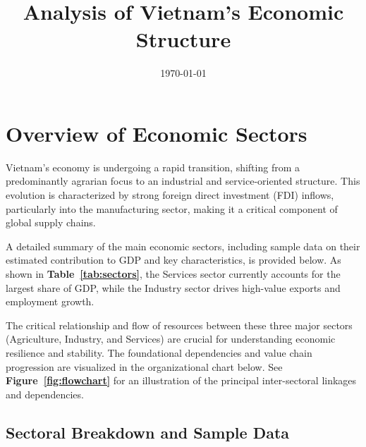 \documentclass{article}
\title{Analysis of Vietnam's Economic Structure}
\date{\today}
\begin{document}
\maketitle

\section{Overview of Economic Sectors}

Vietnam's economy is undergoing a rapid transition, shifting from a predominantly agrarian focus to an industrial and service-oriented structure. This evolution is characterized by strong foreign direct investment (FDI) inflows, particularly into the manufacturing sector, making it a critical component of global supply chains.

A detailed summary of the main economic sectors, including sample data on their estimated contribution to GDP and key characteristics, is provided below. As shown in \textbf{Table~\ref{tab:sectors}}, the Services sector currently accounts for the largest share of GDP, while the Industry sector drives high-value exports and employment growth.

The critical relationship and flow of resources between these three major sectors (Agriculture, Industry, and Services) are crucial for understanding economic resilience and stability. The foundational dependencies and value chain progression are visualized in the organizational chart below. See \textbf{Figure~\ref{fig:flowchart}} for an illustration of the principal inter-sectoral linkages and dependencies.

\subsection{Sectoral Breakdown and Sample Data}
\end{document}
